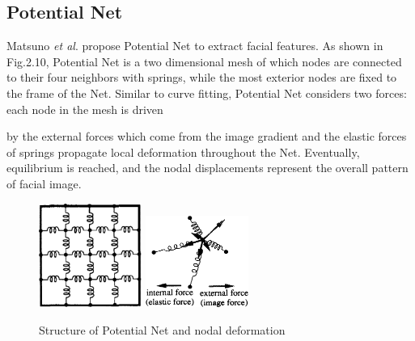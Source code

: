 \documentclass[12pt, twoside]{report}
\begin{document}
	\subsection{Potential Net}
	\par 
	Matsuno \textit{et al}. \cite{61} \cite{41} propose Potential Net to extract facial features. As shown in Fig.2.10, Potential Net is a two dimensional mesh of which nodes are connected to their four neighbors with springs, while the most exterior nodes are fixed to the frame of the Net. Similar to curve fitting, Potential Net considers two forces: each node in the mesh is driven

	\newpage
	by the external forces which come from the image gradient and the elastic forces of springs
propagate local deformation throughout the Net. Eventually, equilibrium is reached, and
the nodal displacements represent the overall pattern of facial image.
	\begin{figure}
		\begin{center}
			\includegraphics[width=0.3\textwidth]{img/92_1.png}
			\includegraphics[width=0.3\textwidth]{img/92_3.png}		
		\end{center}
		\caption{Structure of Potential Net and nodal deformation
		\cite{61}}
		\label{Fig 2.10}
	\end{figure}
\end{document}
